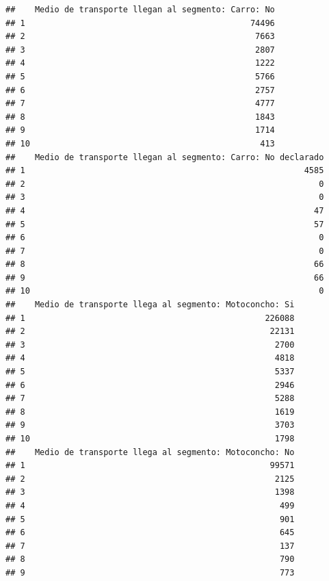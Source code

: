 \documentclass[11pt,]{article}
\begin{document}
\begin{verbatim}
##    Medio de transporte llegan al segmento: Carro: No
## 1                                              74496
## 2                                               7663
## 3                                               2807
## 4                                               1222
## 5                                               5766
## 6                                               2757
## 7                                               4777
## 8                                               1843
## 9                                               1714
## 10                                               413
##    Medio de transporte llegan al segmento: Carro: No declarado
## 1                                                         4585
## 2                                                            0
## 3                                                            0
## 4                                                           47
## 5                                                           57
## 6                                                            0
## 7                                                            0
## 8                                                           66
## 9                                                           66
## 10                                                           0
##    Medio de transporte llega al segmento: Motoconcho: Si
## 1                                                 226088
## 2                                                  22131
## 3                                                   2700
## 4                                                   4818
## 5                                                   5337
## 6                                                   2946
## 7                                                   5288
## 8                                                   1619
## 9                                                   3703
## 10                                                  1798
##    Medio de transporte llega al segmento: Motoconcho: No
## 1                                                  99571
## 2                                                   2125
## 3                                                   1398
## 4                                                    499
## 5                                                    901
## 6                                                    645
## 7                                                    137
## 8                                                    790
## 9                                                    773

\end{verbatim}
\end{document}
